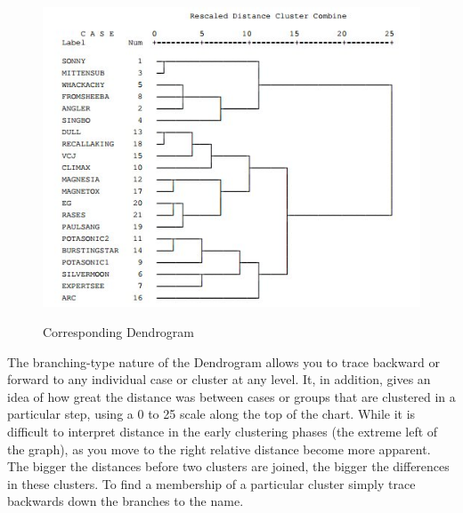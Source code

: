 \begin{figure}
	\includegraphics[scale=1.0]{images/Dendro}\\
	\caption{Corresponding Dendrogram}
\end{figure}

The branching-type nature of the Dendrogram allows you to trace backward or forward to any individual
case or cluster at any level. It, in addition, gives an idea of how great the distance was between cases or
groups that are clustered in a particular step, using a 0 to 25 scale along the top of the chart. While it is
difficult to interpret distance in the early clustering phases (the extreme left of the graph), as you move to
the right relative distance become more apparent. The bigger the distances before two clusters are joined,
the bigger the differences in these clusters. To find a membership of a particular cluster simply trace
backwards down the branches to the name.

\newpage
